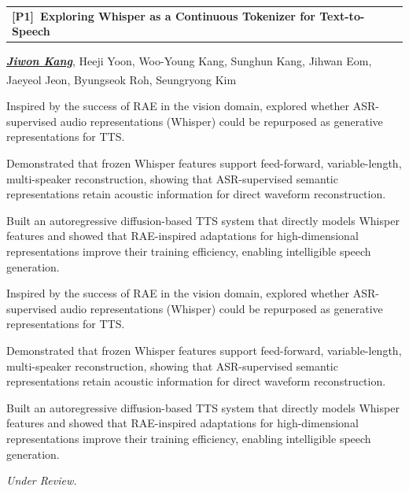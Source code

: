 \documentclass[11pt,letterpaper]{article}
\makeatletter
\newcommand{\cv@line}[2]{{\parfillskip=0pt\relax\noindent#1\hfill#2\null\par}}
\newcommand{\cventry}[4]{%
  \cv@line{\textbf{#1}}{#2}%
  \def\cv@second{#3}%
  \ifx\cv@second\@empty\else
    \vspace{-7pt}%
    \cv@line{#3}{#4}%
  \fi
  \vspace{-5pt}%
}
\newcommand{\me}[1]{\textbf{\textit{\uline{#1}}}}   %
\newcommand{\corr}{\textsuperscript{\dag}}          %
\newcommand{\pubitem}[6]{%
  \begingroup
  \setlength{\parfillskip}{0pt}%
  \noindent\begin{minipage}{\linewidth}%
  \setlength{\tabcolsep}{0pt}%
  \noindent
  \begin{tabularx}{\linewidth}{@{}>{\RaggedRight\arraybackslash}X @{\hspace{1.5em}} r@{}}
    \textbf{#1\ #2} & #3
  \end{tabularx}\par
  #4\par
  \def\pub@desc{#6}%
  \ifx\pub@desc\@empty\else
    \begin{cvbullets}#6\end{cvbullets}%
  \fi
  \textit{#5}\par
  \end{minipage}%
  \par
  \endgroup
}
\makeatother
\begin{document}
\pubitem{[P1]}
  {\label{Whisper}Exploring Whisper as a Continuous Tokenizer for Text-to-Speech}
  {} %
  {\me{Jiwon Kang}, Heeji Yoon, Woo-Young Kang, Sunghun Kang, Jihwan Eom, Jaeyeol Jeon, Byungseok Roh, Seungryong Kim\corr}
  {Under Review.}
  {\item Inspired by the success of RAE in the vision domain, explored whether ASR-supervised audio representations (Whisper) could be repurposed as generative representations for TTS.
  \item Demonstrated that frozen Whisper features support feed-forward, variable-length, multi-speaker reconstruction, showing that ASR-supervised semantic representations retain acoustic information for direct waveform reconstruction.

  \item Built an autoregressive diffusion-based TTS system that directly models Whisper features and showed that RAE-inspired adaptations for high-dimensional representations improve their training efficiency, enabling intelligible speech generation.

  }




\end{document}
